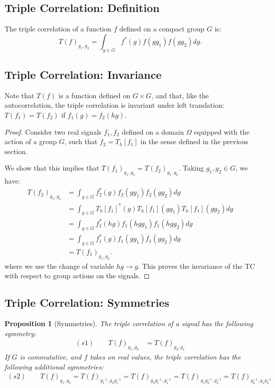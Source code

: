 \documentclass{article}
\newtheorem{proposition}{Proposition}
\begin{document}
\subsection{Triple Correlation: Definition}

The triple correlation of a function $f$ defined on a compact group $G$ is:
$$
T(f)_{g_1, g_2}=\int_{g \in G} f^*(g) f\left(g g_1\right) f\left(g g_2\right)dg .
$$

\subsection{Triple Correlation: Invariance}
Note that $T(f)$ is a function defined on $G \times G$, and that, like the autocorrelation, the triple correlation is invariant under left translation: $T(f_1)=T(f_2)$ if $f_1(g)=f_2(h g)$.

\begin{proof}
Consider two real signals $f_1, f_2$ defined on a domain $\Omega$ equipped with the action of a group $G$, such that $f_2 = T_h[f_1]$ in the sense defined in the previous section.

We show that this implies that $T(f_1)_{g_1, g_2} = T(f_2)_{g_1, g_2}$. Taking $g_1, g_2 \in G$, we have:
\begin{align*}
    T(f_2)_{g_1, g_2}
        &= \int_{g \in G}
            f_2^*(g) f_2\left(gg_1\right) f_2\left(gg_2\right) dg  \\
        &= \int_{g \in G}
            T_h[f_1]^*(g) T_h[f_1]\left(gg_1\right) T_h[f_1]\left(gg_2\right) dg  \\
        &= \int_{g \in G}
            f_1^*(hg) f_1\left(hgg_1\right) f_1\left(hgg_2\right) dg  \\
        &= \int_{g \in G}
            f_1^*(g) f_1\left(gg_1\right) f_1\left(gg_2\right) dg \\
        &=  T(f_1)_{g_1, g_2}.
\end{align*}
where we use the change of variable $hg \rightarrow g$. This proves the invariance of the TC with respect to group actions on the signals.
\end{proof}

\subsection{Triple Correlation: Symmetries}

\begin{proposition}[Symmetries]
The triple correlation of a signal has the following symmetry:
\begin{align*}
     (s1) \qquad T(f)_{g_1, g_2} &= T(f)_{g_2, g_1}
\end{align*}
If $G$ is commutative, and $f$ takes on real values, the triple correlation has the following additional symmetries:
\begin{align*}
     (s2) \qquad T(f)_{g_1, g_2}
     = T(f)_{g^{-1}_1, g_2g^{-1}_1}
     = T(f)_{g_2g^{-1}_1, g^{-1}_1}
     = T(f)_{g_1g^{-1}_2, g^{-1}_2}
     = T(f)_{g^{-1}_2, g_1g^{-1}_2}
\end{align*}
\end{proposition}
\end{document}
